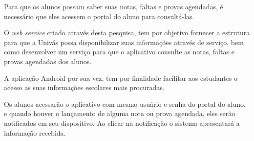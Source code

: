 
	\par Para que os alunos possam saber suas notas, faltas e provas agendadas,
é necessário que eles acessem o portal do aluno para consultá-las.

	\par O \textit{web service} criado através desta pesquisa, tem por objetivo
fornecer a estrutura para que a Univás possa disponibilizar suas informações
através de serviço, bem como desenvolver um serviço para que o aplicativo
consulte as notas, faltas e provas agendadas dos alunos.

	\par A aplicação Android por sua vez, tem por finalidade facilitar aos
estudantes o acesso as suas informações escolares mais procuradas.
	
	\par Os alunos acessarão o aplicativo com mesmo usuário e senha do
portal do aluno, e quando houver o lançamento de alguma nota ou prova agendada,
eles serão notificados em seu dispositivo. Ao clicar na notificação
o sistema apresentará a informação recebida. 